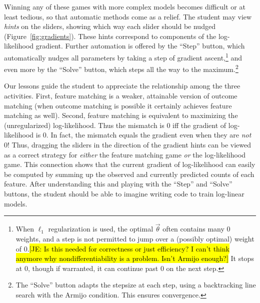 \documentclass[11pt,letterpaper]{article}
\newcommand{\Note}[1]{}
\renewcommand{\Note}[1]{\hl{[#1]}}  %
\newcommand{\NoteSigned}[3]{{\sethlcolor{#2}\Note{#1: #3}}}
\newcommand{\NoteJE}[1]{\NoteSigned{JE}{LightGreen}{#1}}
\begin{document}
Winning any of these games with more complex models becomes difficult
or at least tedious, so that automatic methods come as a relief.  The
student may view {\em hints} on the sliders, showing which way each
slider should be nudged (Figure~\ref{fig:gradients}).  These hints
correspond to components of the log-likelihood gradient.  Further
automation is offered by the ``Step'' button, which automatically
nudges all parameters by taking a step of gradient
ascent,\footnote{When $\ell_1$ regularization is used, the optimal
  $\vec{\theta}$ often contains many 0 weights, and a step
  is not permitted to jump over a (possibly optimal) weight of
  0.\NoteJE{Is this needed for correctness or just efficiency?  I
    can't think anymore why nondifferentiability is a problem.  Isn't
    Armijo enough?}  It stops at 0, though if warranted, it can
  continue past 0 on the next step.} and even more by the ``Solve''
button, which steps all the way to the maximum.\footnote{The ``Solve''
  button adapts the stepsize at each step, using a backtracking line
  search with the Armijo condition.  This ensures convergence.}

Our lessons guide the student to appreciate the relationship
among the three activities.  First, feature matching is a weaker,
attainable version of outcome matching (when outcome matching is
possible it certainly achieves feature matching as well).  Second,
feature matching is equivalent to maximizing the (unregularized)
log-likelihood.  Thus the mismatch is 0 iff the gradient of
log-likelihood is 0.  In fact, the mismatch equals the gradient even
when they are {\em not} 0!  Thus, dragging the sliders in the
direction of the gradient hints can be viewed as a correct strategy
for {\em either} the feature matching game {\em or} the log-likelihood
game.  This connection shows that the current gradient of log-likelihood can
easily be computed by summing up the observed and currently predicted
counts of each feature.  After understanding this and playing with the ``Step'' and
``Solve'' buttons, the student should be able to imagine writing code
to train log-linear models.

\end{document}
